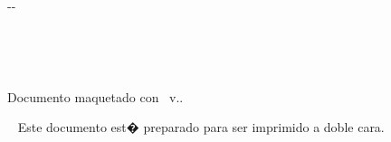{\begin{cambiamargen}{-\cambioIzquierdo}{-\cambioDerecho}
\vfill

\begin{center}
\textbf{\autorPortadaVal}\\[0.3cm]
\textbf{\fechaPublicacionVal}
  
\end{center}

\end{cambiamargen}

\newpage

\thispagestyle{empty}
\mbox{ }
\vfill%
\begin{small} 
\begin{center}
\ifx\noTeXiSCreditsVal\undefined
  Documento maquetado con \texis\ v.\texisVer.
\else
\mbox{ }
\fi
\end{center}
\end{small}
\vspace*{2cm}
\begin{small} 
\begin{center}
\ifx\explicacionDobleCaraVal\undefined
\mbox{ }
\else
\noindent Este documento est� preparado para ser imprimido a doble
cara.
\fi
\end{center}
\end{small}


\newpage

\thispagestyle{empty}

\mbox{ }

\begin{Huge}
\begin{center}
\tituloPortadaVal
\end{center}
\end{Huge}

\vfill

\begin{large}
\begin{center}
\textoPrimerSubtituloPortadaVal
\\ \mbox{ } \\ \mbox{ } \\ 
\textoSegundoSubtituloPortadaVal \\ [0.3em]
\end{center}
\end{large}

\vfill

\begin{large}
\begin{center}
\textbf{\institucionVal}\\[0.2em]
    \mbox{ }  \\
\textbf{\fechaPublicacionVal}
\end{center}
\end{large}


}
